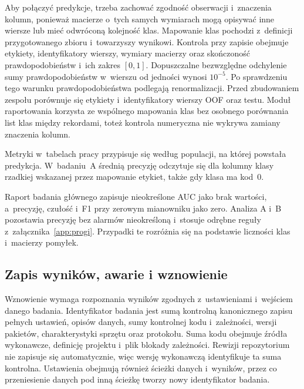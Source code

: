 Aby połączyć predykcje, trzeba zachować zgodność obserwacji i~znaczenia kolumn, ponieważ macierze o~tych samych wymiarach mogą opisywać inne wiersze lub mieć odwróconą kolejność klas. Mapowanie klas pochodzi z~definicji przygotowanego zbioru i~towarzyszy wynikowi. Kontrola przy zapisie obejmuje etykiety, identyfikatory wierszy, wymiary macierzy oraz skończoność prawdopodobieństw i~ich zakres $[0,1]$. Dopuszczalne bezwzględne odchylenie sumy prawdopodobieństw w~wierszu od jedności wynosi $10^{-5}$. Po sprawdzeniu tego warunku prawdopodobieństwa podlegają renormalizacji. Przed zbudowaniem zespołu porównuje się etykiety i~identyfikatory wierszy OOF oraz testu. Moduł raportowania korzysta ze wspólnego mapowania klas bez osobnego porównania list klas między rekordami, toteż kontrola numeryczna nie wykrywa zamiany znaczenia kolumn.

Metryki w~tabelach pracy przypisuje się według populacji, na której powstała predykcja. W~badaniu~A średnią precyzję odczytuje się dla kolumny klasy rzadkiej wskazanej przez mapowanie etykiet, także gdy klasa ma kod~0.

Raport badania głównego zapisuje nieokreślone AUC jako brak wartości, a~precyzję, czułość i~F1 przy zerowym mianowniku jako zero. Analiza A i~B pozostawia precyzję bez alarmów nieokreśloną i~stosuje odrębne reguły z~załącznika~\ref{app:progi}. Przypadki te rozróżnia się na podstawie liczności klas i~macierzy pomyłek.

\subsection{Zapis wyników, awarie i wznowienie}
\label{sec:artefakty-wznowienie}

Wznowienie wymaga rozpoznania wyników zgodnych z~ustawieniami i~wejściem danego badania. Identyfikator badania jest sumą kontrolną kanonicznego zapisu pełnych ustawień, opisów danych, sumy kontrolnej kodu i~zależności, wersji pakietów, charakterystyki sprzętu oraz protokołu. Suma kodu obejmuje źródła wykonawcze, definicję projektu i~plik blokady zależności. Rewizji repozytorium nie zapisuje się automatycznie, więc wersję wykonawczą identyfikuje ta suma kontrolna. Ustawienia obejmują również ścieżki danych i~wyników, przez co przeniesienie danych pod inną ścieżkę tworzy nowy identyfikator badania.

